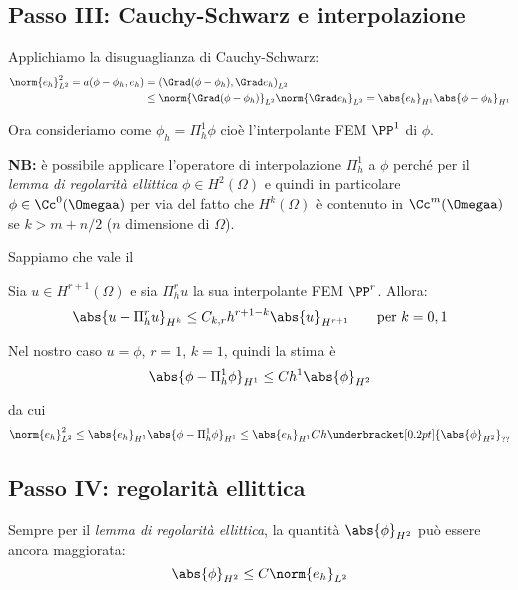 \subsection*{Passo III: Cauchy-Schwarz e interpolazione}

Applichiamo la disuguaglianza di Cauchy-Schwarz:
\begin{align*}
\norm{e_h}^2_{L^2}=a(\phi-\phi_h,e_h)&=\left(\Grad(\phi-\phi_h),\Grad e_h\right)_{L^2} \\
&\leq \norm{\Grad(\phi-\phi_h)}_{L^2}\norm{\Grad e_h}_{L^2}=\abs{e_h}_{H^1}\abs{\phi-\phi_h}_{H^1}
\end{align*}

Ora consideriamo come $\phi_h=\Pi_h^1\phi$ cioè l'interpolante FEM $\PP^1$ di $\phi$. 

\textbf{NB:} è possibile applicare l'operatore di interpolazione $\Pi_h^1$ a $\phi$ perché per il \emph{lemma di regolarità ellittica} $\phi\in H^2(\Omega)$ e quindi in particolare $\phi\in\Cc^0(\Omegaa)$ per via del fatto che $H^k(\Omega)$ è contenuto in $\Cc^m(\Omegaa)$ se $k>m+n/2$ ($n$ dimensione di $\Omega$). 

Sappiamo che vale il

\begin{thm}
Sia $u\in H^{r+1}(\Omega)$ e sia $\Pi_h^r u$ la sua interpolante FEM $\PP^r$. Allora:
\begin{equation*}
\abs{u-\Pi_h^r u}_{H^k}\leq C_{k,r} h^{r+1-k}\abs{u}_{H^{r+1}}\qquad \text{per }k=0,1
\end{equation*}
\end{thm}

Nel nostro caso $u=\phi$, $r=1$, $k=1$, quindi la stima è
\begin{equation*}
\abs{\phi-\Pi_h^1 \phi}_{H^1}\leq C h^{1}\abs{\phi}_{H^2}
\end{equation*}

da cui
\begin{equation*}
\norm{e_h}^2_{L^2}\leq \abs{e_h}_{H^1}\abs{\phi-\Pi_h^1\phi}_{H^1}\leq \abs{e_h}_{H^1} C h\underbracket[0.2pt]{\abs{\phi}_{H^2}}_{\text{??}}
\end{equation*}

\subsection*{Passo IV: regolarità ellittica}

Sempre per il \emph{lemma di regolarità ellittica}, la quantità $\abs{\phi}_{H^2}$ può essere ancora maggiorata:
\begin{equation*}
\abs{\phi}_{H^2}\leq C \norm{e_h}_{L^2}
\end{equation*}

